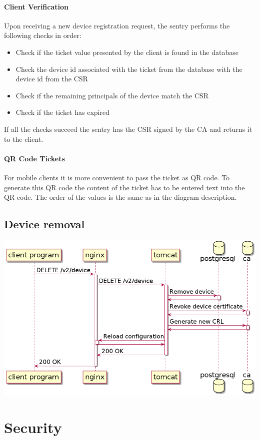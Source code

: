 \documentclass[12pt]{report}
\begin{document}
\paragraph{Client Verification}
Upon receiving a new device registration request, the sentry performs the following checks in order:
\begin{itemize}
\item Check if the ticket value presented by the client is found in the database
\item Check the device id associated with the ticket from the database with the device id from the CSR
\item Check if the remaining principals of the device match the CSR
\item Check if the ticket has expired
\end{itemize}
If all the checks succeed the sentry has the CSR signed by the CA and returns it to the client. 

\paragraph{QR Code Tickets}
For mobile clients it is more convenient to pass the ticket as QR code. To generate this QR code the content of the ticket has to be
entered text into the QR code. The order of the values is the same as in the diagram description. 

\subsection{Device removal}

\includegraphics[width=\linewidth]{diagrams/remove-device.png}

\section{Security}
\end{document}
